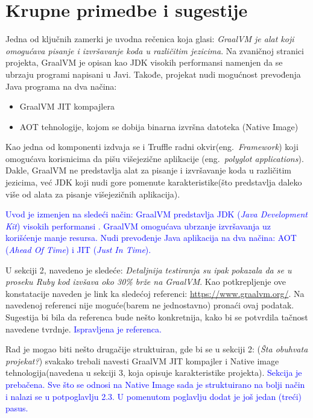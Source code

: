 \documentclass[a4paper]{report}
\newcommand{\odgovor}[1]{\textcolor{blue}{#1}}
\begin{document}
\section{Krupne primedbe i sugestije}
Jedna od ključnih zamerki je uvodna rečenica koja glasi: \textit{GraalVM je alat koji omogućava pisanje i izvršavanje koda u različitim
jezicima}. Na zvaničnoj stranici projekta, GraalVM je opisan kao JDK visokih performansi namenjen da se ubrzaju programi napisani u Javi.
Takođe, projekat nudi mogućnost prevođenja Java programa na dva načina:
\begin{itemize}
    \item GraalVM JIT kompajlera
    \item AOT tehnologije, kojom se dobija binarna izvršna datoteka (Native Image)
\end{itemize}
Kao jedna od komponenti izdvaja se i Truffle radni okvir(eng.~{\em Framework}) koji omogućava korisnicima da pišu višejezične aplikacije 
(eng.~{\em polyglot applications}). 
Dakle, GraalVM ne predstavlja alat za pisanje i izvršavanje koda u različitim jezicima, već JDK koji nudi gore pomenute karakteristike(što 
predstavlja daleko više od alata za pisanje višejezičnih aplikacija).

\odgovor{
Uvod je izmenjen na sledeći način:
GraalVM predstavlja JDK (\emph{Java Development Kit}) visokih performansi \cite{graalvmintroduction}. GraalVM omogućava ubrzanje izvršavanja uz korišćenje manje resursa. Nudi prevođenje Java aplikacija na dva načina: AOT (\emph{Ahead Of Time}) i JIT (\emph{Just In Time}).
}

U sekciji 2, navedeno je sledeće: \textit{Detaljnija testiranja su ipak pokazala da se u proseku Ruby kod izvšava oko 30\% brže na GraalVM}. 
Kao potkrepljenje ove konstatacije naveden je link ka sledećoj referenci: \href{https://www.graalvm.org/}{https://www.graalvm.org/}. Na 
navedenoj referenci nije moguće(barem ne jednostavno) pronaći ovaj podatak. Sugestija bi bila da referenca bude nešto konkretnija, kako bi se 
potvrdila tačnost navedene tvrdnje. 
\odgovor{Ispravljena je referenca.}

Rad je mogao biti nešto drugačije struktuiran, gde bi se u sekciji 2: (\textit{Šta obuhvata projekat?}) svakako trebali navesti GraalVM JIT 
kompajler i Native image tehnologija(navedena u sekciji 3, koja opisuje karakteristike projekta). 
\odgovor{Sekcija je prebačena. Sve što se odnosi na Native Image sada je struktuirano na bolji način i nalazi se u potpoglavlju 2.3. U pomenutom poglavlju dodat je još jedan (treći) pasus.}
\end{document}
